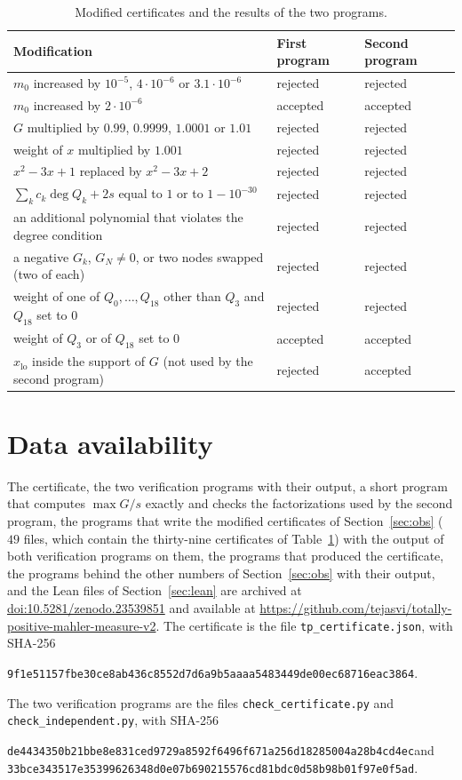 \documentclass[11pt]{amsart}
\theoremstyle{remark}
\numberwithin{equation}{section}
\newcommand{\CertFile}{tp\_certificate.json}
\newcommand{\CertSha}{9f1e51157fbe30ce8ab436c8552d7d6a9b5aaaa5483449de00ec68716eac3864}
\newcommand{\ShaChkA}{de4434350b21bbe8e831ced9729a8592f6496f671a256d18285004a28b4cd4ec}
\newcommand{\ShaChkB}{33bce343517e35399626348d0e07b690215576cd81bdc0d58b98b01f97e0f5ad}
\newcommand{\SuppDOI}{10.5281/zenodo.23539851}
\newcommand{\RepoLink}{\url{https://github.com/tejasvi/totally-positive-mahler-measure-v2}}
\begin{document}
\begin{table}[ht]
\caption{Modified certificates and the results of the two programs.}\label{tab:tests}
\small
\begin{tabular}{@{}lll@{}}
\toprule
Modification & First program & Second program\\
\midrule
$m_0$ increased by $10^{-5}$, $4\cdot10^{-6}$ or $3.1\cdot10^{-6}$ & rejected & rejected\\
$m_0$ increased by $2\cdot10^{-6}$ & accepted & accepted\\
$G$ multiplied by $0.99$, $0.9999$, $1.0001$ or $1.01$ & rejected & rejected\\
weight of $x$ multiplied by $1.001$ & rejected & rejected\\
$x^2-3x+1$ replaced by $x^2-3x+2$ & rejected & rejected\\
$\sum_kc_k\deg Q_k+2s$ equal to $1$ or to $1-10^{-30}$ & rejected & rejected\\
an additional polynomial that violates the degree condition & rejected & rejected\\
a negative $G_k$, $G_N\ne0$, or two nodes swapped (two of each) & rejected & rejected\\
weight of one of $Q_0,\dots,Q_{18}$ other than $Q_3$ and $Q_{18}$ set to $0$ & rejected & rejected\\
weight of $Q_3$ or of $Q_{18}$ set to $0$ & accepted & accepted\\
$x_{\mathrm{lo}}$ inside the support of $G$ (not used by the second program) & rejected & accepted\\
\bottomrule
\end{tabular}
\end{table}

\FloatBarrier
\section*{Data availability}
The certificate, the two verification programs with their output, a short program that computes $\max G/s$ exactly and checks the factorizations used by the second program, the programs that write the modified certificates of Section~\ref{sec:obs} ($49$ files, which contain the thirty-nine certificates of Table~\ref{tab:tests}) with the output of both verification programs on them, the programs that produced the certificate, the programs behind the other numbers of Section~\ref{sec:obs} with their output, and the Lean files of Section~\ref{sec:lean} are archived at \href{https://doi.org/\SuppDOI}{doi:\SuppDOI} and available at \RepoLink. The certificate is the file \texttt{\CertFile}, with SHA-256
\begin{center}\small\texttt{\CertSha}.\end{center}
The two verification programs are the files \texttt{check\_certificate.py} and \texttt{check\_independent.py}, with SHA-256
\begin{center}\small\texttt{\ShaChkA}\quad and\\ \texttt{\ShaChkB}.\end{center}
\end{document}
